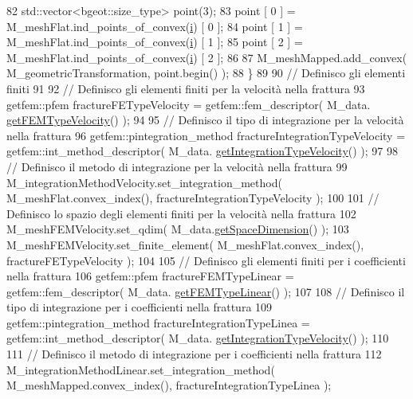 \begin{DoxyCode}
82         std::vector<bgeot::size\_type> point(3);
83         point [ 0 ] = M\_meshFlat.ind\_points\_of\_convex(\hyperlink{matrici_8m_a6f6ccfcf58b31cb6412107d9d5281426}{i}) [ 0 ];
84         point [ 1 ] = M\_meshFlat.ind\_points\_of\_convex(\hyperlink{matrici_8m_a6f6ccfcf58b31cb6412107d9d5281426}{i}) [ 1 ];
85         point [ 2 ] = M\_meshFlat.ind\_points\_of\_convex(\hyperlink{matrici_8m_a6f6ccfcf58b31cb6412107d9d5281426}{i}) [ 2 ];
86 
87         M\_meshMapped.add\_convex( M\_geometricTransformation, point.begin() );
88     \}
89 
90     \textcolor{comment}{// Definisco gli elementi finiti}
91 
92     \textcolor{comment}{// Definisco gli elementi finiti per la velocità nella frattura}
93     getfem::pfem fractureFETypeVelocity = getfem::fem\_descriptor( M\_data.
      \hyperlink{classFractureData_a7396b67399a1ae8e5550841907c0dcb5}{getFEMTypeVelocity}() );
94 
95     \textcolor{comment}{// Definisco il tipo di integrazione per la velocità nella frattura}
96     getfem::pintegration\_method fractureIntegrationTypeVelocity = getfem::int\_method\_descriptor( M\_data.
      \hyperlink{classFractureData_a8a8a198482de6bf4104746bc1d0510c6}{getIntegrationTypeVelocity}() );
97 
98     \textcolor{comment}{// Definisco il metodo di integrazione per la velocità nella frattura}
99     M\_integrationMethodVelocity.set\_integration\_method( M\_meshFlat.convex\_index(), 
      fractureIntegrationTypeVelocity );
100     
101     \textcolor{comment}{// Definisco lo spazio degli elementi finiti per la velocità nella frattura}
102     M\_meshFEMVelocity.set\_qdim( M\_data.\hyperlink{classFractureData_a4ead03266295fe14fa3285692f945d89}{getSpaceDimension}() );
103     M\_meshFEMVelocity.set\_finite\_element( M\_meshFlat.convex\_index(), fractureFETypeVelocity );
104 
105     \textcolor{comment}{// Definisco gli elementi finiti per i coefficienti nella frattura}
106     getfem::pfem fractureFEMTypeLinear = getfem::fem\_descriptor( M\_data.
      \hyperlink{classFractureData_a606c22e054fdb5f8602ce39fa6ae15cc}{getFEMTypeLinear}() );
107 
108     \textcolor{comment}{// Definisco il tipo di integrazione per i coefficienti nella frattura}
109     getfem::pintegration\_method fractureIntegrationTypeLinea = getfem::int\_method\_descriptor( M\_data.
      \hyperlink{classFractureData_a8a8a198482de6bf4104746bc1d0510c6}{getIntegrationTypeVelocity}() );
110 
111     \textcolor{comment}{// Definisco il metodo di integrazione per i coefficienti nella frattura}
112     M\_integrationMethodLinear.set\_integration\_method( M\_meshMapped.convex\_index(), 
      fractureIntegrationTypeLinea );

\end{DoxyCode}
